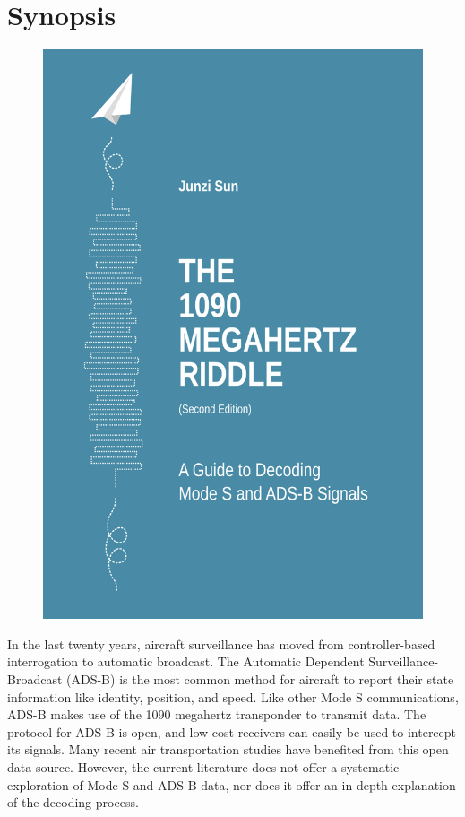 \chapter*{Synopsis}


\begin{figure}[ht]
    \centering
    \includegraphics[scale=0.9]{cover/front.pdf}
\end{figure}


In the last twenty years, aircraft surveillance has moved from controller-based interrogation to automatic broadcast. The Automatic Dependent Surveillance-Broadcast (ADS-B) is the most common method for aircraft to report their state information like identity, position, and speed. Like other Mode S communications, ADS-B makes use of the 1090 megahertz transponder to transmit data. The protocol for ADS-B is open, and low-cost receivers can easily be used to intercept its signals. Many recent air transportation studies have benefited from this open data source. However, the current literature does not offer a systematic exploration of Mode S and ADS-B data, nor does it offer an in-depth explanation of the decoding process.

